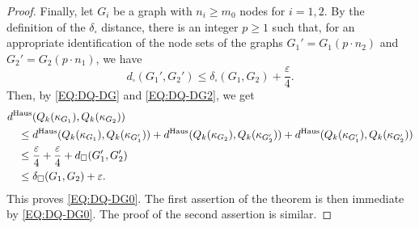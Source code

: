 \documentclass[10pt]{article}
\theoremstyle{plain}
\theoremstyle{definition}
\newcommand{\eps}{\varepsilon}
\newcommand{\Haus}{{\text{\rm Haus}}}
\begin{document}
\begin{proof}
Finally, let $G_i$ be a graph with $n_i\ge m_0$ nodes for $i=1,2$. By the
definition of the $\delta_\square$ distance, there is an integer $p\ge 1$ such
that, for an appropriate identification of the node sets of the graphs
$G_1'=G_1(p\cdot n_2)$ and $G_2'=G_2(p\cdot n_1)$, we have
\[
d_\square(G_1',G_2')\le \delta_\square(G_1,G_2)+\frac{\eps}{4}.
\]
Then, by \eqref{EQ:DQ-DG} and \eqref{EQ:DQ-DG2}, we get
\begin{align*}
&d^\Haus(Q_k(\kappa_{G_1}), Q_k(\kappa_{G_2}))\\
&\quad\le
d^\Haus(Q_k(\kappa_{G_1}), Q_k(\kappa_{G_1'}))+d^\Haus(Q_k(\kappa_{G_2}), Q_k(\kappa_{G_2'}))+d^\Haus(Q_k(\kappa_{G_1'}), Q_k(\kappa_{G_2'}))\\
&\quad\le \frac{\eps}{4}+\frac{\eps}{4}+d_\square(G_1',G_2')\\
&\quad\le \delta_\square(G_1,G_2)+\eps.
\end{align*}
This proves \eqref{EQ:DQ-DG0}. The first assertion of the theorem is then immediate by \eqref{EQ:DQ-DG0}. The proof of the second assertion is similar.
\end{proof}
\end{document}
